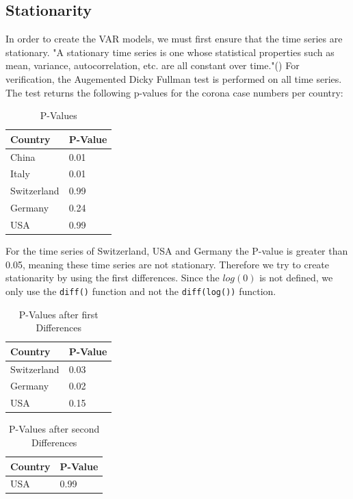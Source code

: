 \documentclass[11pt]{article}
\begin{document}
\subsection{Stationarity}
In order to create the VAR models, we must first ensure that the time series are stationary. "A stationary time series is one whose statistical properties such as mean, variance, autocorrelation, etc. are all constant over time."(\cite{Stationa72:online}) For verification, the Augemented Dicky Fullman test is performed on all time series. The test returns the following p-values for the corona case numbers per country:
\begin{table}[h!]
\centering
\caption{P-Values }
\label{tab:p-values-corona}
\begin{tabular}{|l|l|}
\hline
\textbf{Country} & \textbf{P-Value} \\ \hline
China            & 0.01             \\ \hline
Italy            & 0.01             \\ \hline
Switzerland      & 0.99             \\ \hline
Germany          & 0.24             \\ \hline
USA              & 0.99             \\ \hline
\end{tabular}
\end{table}
For the time series of Switzerland, USA and Germany the P-value is greater than 0.05, meaning these time series are not stationary. Therefore we try to create stationarity by using the first differences. Since the $log(0)$ is not defined, we only use the \lstinline{diff()} function and  not the \lstinline{diff(log())} function.
\begin{table}[h!]
\centering
\caption{P-Values after first Differences}
\label{tab:p-values-first-diff}
\begin{tabular}{|l|l|}
\hline
\textbf{Country} & \textbf{P-Value} \\ \hline
Switzerland      & 0.03             \\ \hline
Germany          & 0.02             \\ \hline
USA              & 0.15             \\ \hline
\end{tabular}
\end{table}

\begin{table}[h!]
\centering
\caption{P-Values after second Differences}
\label{tab:p-values-second-diff}
\begin{tabular}{|l|l|}
\hline
\textbf{Country} & \textbf{P-Value} \\ \hline
USA              & 0.99             \\ \hline
\end{tabular}
\end{table}
\end{document}
